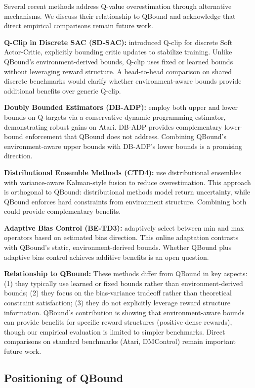 \documentclass[11pt]{article}
\theoremstyle{definition}
\theoremstyle{remark}
\begin{document}
Several recent methods address Q-value overestimation through alternative mechanisms. We discuss their relationship to QBound and acknowledge that direct empirical comparisons remain future work.

\textbf{Q-Clip in Discrete SAC (SD-SAC):} \citet{zhou2022sd} introduced Q-clip for discrete Soft Actor-Critic, explicitly bounding critic updates to stabilize training. Unlike QBound's environment-derived bounds, Q-clip uses fixed or learned bounds without leveraging reward structure. A head-to-head comparison on shared discrete benchmarks would clarify whether environment-aware bounds provide additional benefits over generic Q-clip.

\textbf{Doubly Bounded Estimators (DB-ADP):} \citet{ren2022doubly} employ both upper and lower bounds on Q-targets via a conservative dynamic programming estimator, demonstrating robust gains on Atari. DB-ADP provides complementary lower-bound enforcement that QBound does not address. Combining QBound's environment-aware upper bounds with DB-ADP's lower bounds is a promising direction.

\textbf{Distributional Ensemble Methods (CTD4):} \citet{wu2023ctd4} use distributional ensembles with variance-aware Kalman-style fusion to reduce overestimation. This approach is orthogonal to QBound: distributional methods model return uncertainty, while QBound enforces hard constraints from environment structure. Combining both could provide complementary benefits.

\textbf{Adaptive Bias Control (BE-TD3):} \citet{lee2022betd3} adaptively select between min and max operators based on estimated bias direction. This online adaptation contrasts with QBound's static, environment-derived bounds. Whether QBound plus adaptive bias control achieves additive benefits is an open question.

\textbf{Relationship to QBound:} These methods differ from QBound in key aspects: (1) they typically use learned or fixed bounds rather than environment-derived bounds; (2) they focus on the bias-variance tradeoff rather than theoretical constraint satisfaction; (3) they do not explicitly leverage reward structure information. QBound's contribution is showing that environment-aware bounds can provide benefits for specific reward structures (positive dense rewards), though our empirical evaluation is limited to simpler benchmarks. Direct comparisons on standard benchmarks (Atari, DMControl) remain important future work.

\subsection{Positioning of QBound}
\end{document}
